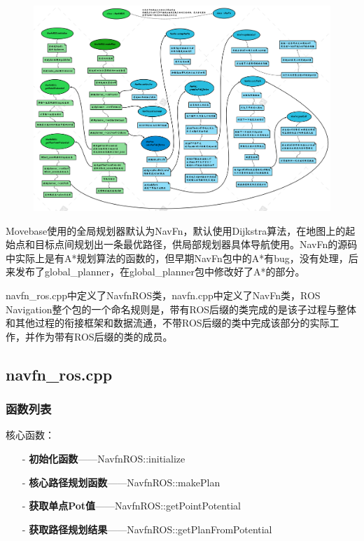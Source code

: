 \documentclass[9pt, oneside]{book}
\begin{document}
\begin{figure}[H]
    \centering
    \includegraphics[width=1.0\linewidth]{image/navfn.png}
\end{figure}

Movebase使用的全局规划器默认为NavFn，默认使用Dijkstra算法，在地图上的起始点和目标点间规划出一条最优路径，供局部规划器具体导航使用。NavFn的源码中实际上是有A*规划算法的函数的，但早期NavFn包中的A*有bug，没有处理，后来发布了global\_planner，在global\_planner包中修改好了A*的部分。

navfn\_ros.cpp中定义了NavfnROS类，navfn.cpp中定义了NavFn类，ROS Navigation整个包的一个命名规则是，带有ROS后缀的类完成的是该子过程与整体和其他过程的衔接框架和数据流通，不带ROS后缀的类中完成该部分的实际工作，并作为带有ROS后缀的类的成员。

\subsection{navfn\_ros.cpp}

\subsubsection{函数列表}

核心函数：
\begin{itemize}
    \item [-] \textbf{初始化函数}——NavfnROS::initialize
    \item [-] \textbf{核心路径规划函数}——NavfnROS::makePlan
    \item [-] \textbf{获取单点Pot值}——NavfnROS::getPointPotential
    \item [-] \textbf{获取路径规划结果}——NavfnROS::getPlanFromPotential
\end{itemize}
    
\end{document}
